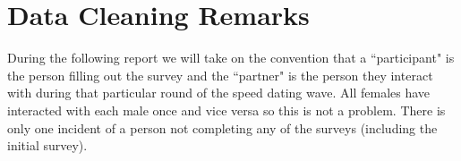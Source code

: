 \documentclass{article}
\begin{document}
\section{Data Cleaning Remarks}
\label{sec:dataclean}
During the following report we will take on the convention that a ``participant" is the person filling out the survey and the ``partner" is the person they interact with during that particular round of the speed dating wave.  
All females have interacted with each male once and vice versa so this is not a problem.  There is only one incident of a person not completing any of the surveys (including the initial survey).\\
\end{document}
